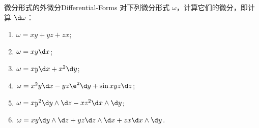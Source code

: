 \begin{problem}{微分形式的外微分}{Differential-Forms}
    对下列微分形式 $\omega$，计算它们的微分，即计算 $\d \omega$：
    \begin{enumerate}
        \item $\omega = xy + yz + zx$;
        \item $\omega = xy \d x$;
        \item $\omega = xy \d x + x^2 \d y$;
        \item $\omega = x^2 y \d x - yz \e^2 \d y + \sin xyz \d z$;
        \item $\omega = xy^2 \d y \wedge \d z - xz^2 \d x \wedge \d y$;
        \item $\omega = xy \d y \wedge \d z + yz \d z \wedge \d x + zx \d x \wedge \d y$.
    \end{enumerate}
\end{problem}


